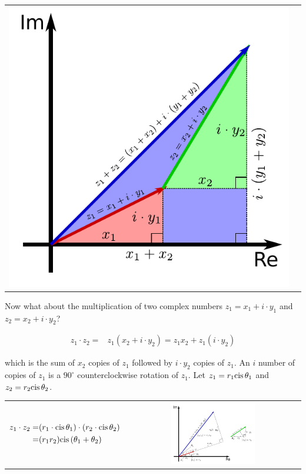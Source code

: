 \documentclass{article}
\newcommand{\cis}{\textnormal{cis}\,}
\begin{document}
\begin{center}
\begin{tabular}{cc}
{\includegraphics[scale = 0.7]{complex_number_addition}
}
\end{tabular}
\end{center}


Now what about the multiplication of two complex numbers \(z_1 = x_1 + i \cdot y_1\) and \(z_2 = x_2 + i \cdot y_2\)?

\begin{align*}
z_1 \cdot z_2 
= & z_1 (x_2 + i \cdot y_2) 
= z_1 x_2 + z_1 (i \cdot y_2)
\end{align*}

which is the sum of \(x_2\) copies of \(z_1\) followed by \(i \cdot y_2\) copies of \(z_1\). An \(i\) number of copies of \(z_1\) is a \(90^\circ\) counterclockwise rotation of \(z_1\). Let \(z_1 = r_1 \cis\theta_1\) and \(z_2 = r_2\cis\theta_2\).  

\begin{center}
\begin{tabular}{cc}  
\parbox{0.5\textwidth}{
\begin{align*}
z_1 \cdot z_2 = & 
(r_1 \cdot \cis\theta_1) \cdot (r_2 \cdot \cis\theta_2) \\ 
= & (r_1 r_2) \cis(\theta_1 + \theta_2)
\end{align*}
} & \parbox{0.5\textwidth}{
\includegraphics[width = 0.5\textwidth]{complex_number_multiplication}
}
\end{tabular}
\end{center}
\end{document}
